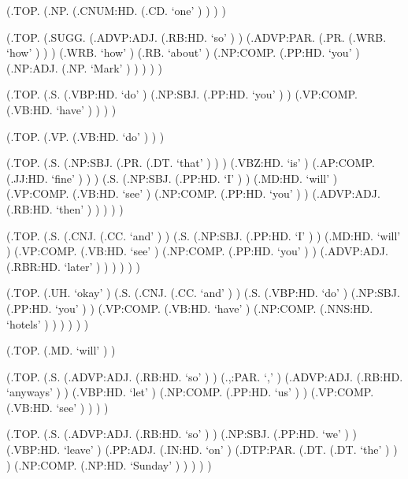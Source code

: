 \documentclass[10pt]{article}
\begin{document}
\begin{parsetree}  (.TOP. (.NP. (.CNUM:HD. (.CD. `one' ) ) ) ) \end{parsetree}

\begin{parsetree}  (.TOP. (.SUGG. (.ADVP:ADJ. (.RB:HD. `so' ) ) (.ADVP:PAR. (.PR. (.WRB. `how' ) ) ) (.WRB. `how' ) (.RB. `about' ) (.NP:COMP. (.PP:HD. `you' ) (.NP:ADJ. (.NP. `Mark' ) ) ) ) ) \end{parsetree}

\begin{parsetree}  (.TOP. (.S. (.VBP:HD. `do' ) (.NP:SBJ. (.PP:HD. `you' ) ) (.VP:COMP. (.VB:HD. `have' ) ) ) ) \end{parsetree}

\begin{parsetree}  (.TOP. (.VP. (.VB:HD. `do' ) ) ) \end{parsetree}

\begin{parsetree}  (.TOP. (.S. (.NP:SBJ. (.PR. (.DT. `that' ) ) ) (.VBZ:HD. `is' ) (.AP:COMP. (.JJ:HD. `fine' ) ) ) (.S. (.NP:SBJ. (.PP:HD. `I' ) ) (.MD:HD. `will' ) (.VP:COMP. (.VB:HD. `see' ) (.NP:COMP. (.PP:HD. `you' ) ) (.ADVP:ADJ. (.RB:HD. `then' ) ) ) ) ) \end{parsetree}

\begin{parsetree}  (.TOP. (.S. (.CNJ. (.CC. `and' ) ) (.S. (.NP:SBJ. (.PP:HD. `I' ) ) (.MD:HD. `will' ) (.VP:COMP. (.VB:HD. `see' ) (.NP:COMP. (.PP:HD. `you' ) ) (.ADVP:ADJ. (.RBR:HD. `later' ) ) ) ) ) ) \end{parsetree}

\begin{parsetree}  (.TOP. (.UH. `okay' ) (.S. (.CNJ. (.CC. `and' ) ) (.S. (.VBP:HD. `do' ) (.NP:SBJ. (.PP:HD. `you' ) ) (.VP:COMP. (.VB:HD. `have' ) (.NP:COMP. (.NNS:HD. `hotels' ) ) ) ) ) ) \end{parsetree}

\begin{parsetree}  (.TOP. (.MD. `will' ) ) \end{parsetree}

\begin{parsetree}  (.TOP. (.S. (.ADVP:ADJ. (.RB:HD. `so' ) ) (.,:PAR. `,' ) (.ADVP:ADJ. (.RB:HD. `anyways' ) ) (.VBP:HD. `let' ) (.NP:COMP. (.PP:HD. `us' ) ) (.VP:COMP. (.VB:HD. `see' ) ) ) ) \end{parsetree}

\begin{parsetree}  (.TOP. (.S. (.ADVP:ADJ. (.RB:HD. `so' ) ) (.NP:SBJ. (.PP:HD. `we' ) ) (.VBP:HD. `leave' ) (.PP:ADJ. (.IN:HD. `on' ) (.DTP:PAR. (.DT. (.DT. `the' ) ) ) (.NP:COMP. (.NP:HD. `Sunday' ) ) ) ) ) \end{parsetree}
\end{document}
